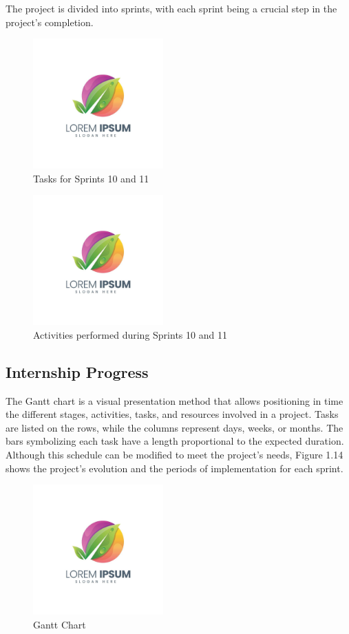 The project is divided into sprints, with each sprint being a crucial step in the project's completion.

\begin{figure}[H]
    \centering
    \includegraphics[width=5cm]{Figures/lorem-ipsum.jpg}
    \caption{Tasks for Sprints 10 and 11}
\end{figure}

\begin{figure}[H]
    \centering
    \includegraphics[width=5cm]{Figures/lorem-ipsum.jpg}
    \caption{Activities performed during Sprints 10 and 11}
\end{figure}

\subsection{Internship Progress}

The Gantt chart is a visual presentation method that allows positioning in time the different stages, activities, tasks, and resources involved in a project. Tasks are listed on the rows, while the columns represent days, weeks, or months. The bars symbolizing each task have a length proportional to the expected duration. Although this schedule can be modified to meet the project's needs, Figure 1.14 shows the project's evolution and the periods of implementation for each sprint.

\begin{figure}[H]
    \centering
    \includegraphics[width=5cm]{Figures/lorem-ipsum.jpg}
    \caption{Gantt Chart}
\end{figure}
